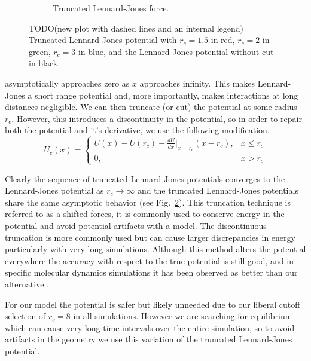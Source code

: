 \begin{figure}[t!]
\begin{subfigure}[t]{.5\textwidth}
			\caption{Truncated Lennard-Jones force. \label{subfig:LJTForce}}
		\end{subfigure}		
		\caption{TODO(new plot with dashed lines and an internal legend) Truncated Lennard-Jones potential with $r_c = 1.5$ in red, $r_c = 2$ in green, $r_c = 3$ in blue, and the Lennard-Jones potential without cut in black.\label{fig:LJT}}	
	\end{figure}	

\noindent	
asymptotically approaches zero as $x$ approaches infinity. This makes Lennard-Jones a short range potential and, more importantly, makes interactions at long distances negligible. We can then truncate (or cut) the potential at some radius $r_c$. However, this introduces a discontinuity in the potential, so in order to repair both the potential and it's derivative, we use the following modification.
\begin{equation}
	U_c(x) = \left\{ 
		\begin{array}{lr}
			U(x) - U(r_c) - \frac{dU}{dx}\bigg|_{x = r_c}(x - r_c), & x \leq r_c\\
			0, & x > r_c
		\end{array}
		\right. 
\end{equation}

	Clearly the sequence of truncated Lennard-Jones potentials converges to the Lennard-Jones potential as $r_c \to \infty$ and the truncated Lennard-Jones potentials share the same asymptotic behavior (see Fig.~\ref{fig:LJT}). This truncation technique is referred to as a shifted forces, it is commonly used to conserve energy in the potential and avoid potential artifacts with a model. The discontinuous truncation is more commonly used but can cause larger discrepancies in energy particularly with very long simulations. Although this method alters the potential everywhere the accuracy with respect to the true potential is still good, and in specific molecular dynamics simulations it has been observed as better than our alternative \cite{Toxvaerd2011}.
	
	For our model the potential is safer but likely unneeded due to our liberal cutoff selection of $r_c = 8$ in all simulations. However we are searching for equilibrium which can cause very long time intervals over the entire simulation, so to avoid artifacts in the geometry we use this variation of the truncated Lennard-Jones potential.

